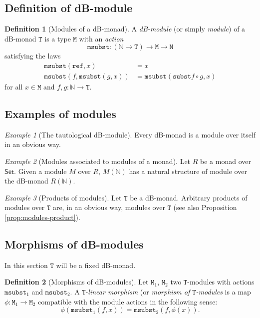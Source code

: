 \documentclass[a4paper,twoside,12pt]{article}
\theoremstyle{definition}
\newtheorem{definition}{Definition}
\theoremstyle{remark}
\theoremstyle{example}
\newtheorem{example}{Example}
\newcommand{\NN}{\mathbb{N}}
\newcommand{\TT}{\mathtt{T}}
\newcommand{\MM}{\mathtt{M}}
\newcommand{\subst}{\mathtt{subst}}
\newcommand{\refe}{\mathtt{ref}}
\newcommand{\msubst}{\mathtt{msubst}}
\begin{document}
\subsection{Definition of dB-module}
\label{sec:definition-module}

\begin{definition}[Modules of a dB-monad]
  A \emph{dB-module} (or simply \emph{module}) of a dB-monad $\TT$ is
  a type $\MM$ with an \emph{action}
  \begin{equation*}
    \msubst\colon (\NN\to \TT) \to \MM \to \MM
  \end{equation*}
  satisfying the laws
  \begin{align*}
    \msubst(\refe,x) &= x\\
    \msubst(f,\msubst(g,x)) &= \msubst(\subst f \circ g, x)
  \end{align*}
  for all $x\in \MM$ and $f,g\colon \NN \to \TT$.
\end{definition}

\subsection{Examples of modules}
\label{sec:examples-modules}

\begin{example}[The tautological dB-module]
  Every dB-monad is a module over itself in an obvious way.
\end{example}

\begin{example}[Modules associated to modules of a monad]
  Let $R$ be a monad over $\mathsf{Set}$.  Given a module $M$ over
  $R$, $M(\NN)$ has a natural structure of module over the dB-monad
  $R(\NN)$.
\end{example}

\begin{example}[Products of modules]
  Let $\TT$ be a dB-monad.  Arbitrary products of modules over $\TT$
  are, in an obvious way, modules over $\TT$ (see also Proposition
  \ref{prop:modules-product}).
\end{example}

\subsection{Morphisms of dB-modules}
\label{sec:morphisms-db-modules}

In this section $\TT$ will be a fixed dB-monad.

\begin{definition}[Morphisms of dB-modules]
  Let $\MM_1$, $\MM_2$ two $\TT$-modules with actions $\msubst_1$ and
  $\msubst_2$.  A $\TT$-\emph{linear morphism} (or \emph{morphism of
    $\TT$-modules} is a map $\phi\colon \MM_1 \to \MM_2$ compatible
  with the module actions in the following sense:
  \begin{equation*}
    \phi(\msubst_1(f,x)) = \msubst_2(f,\phi(x)).
  \end{equation*}
\end{definition}
\end{document}
